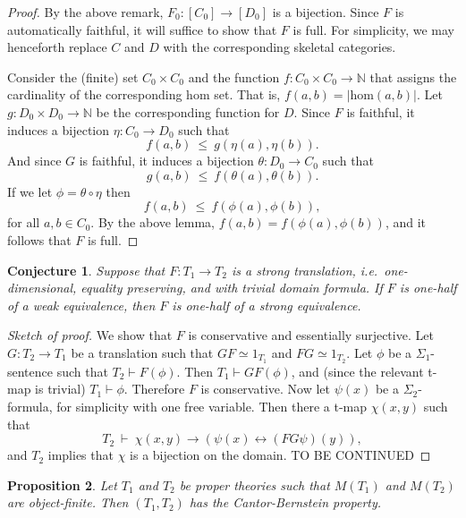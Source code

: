 \documentclass[12pt]{article}
\newtheorem{prop}{Proposition}
\newtheorem{conj}[prop]{Conjecture}
\theoremstyle{definition}
\theoremstyle{remark}
\newcommand{\3}{\mathcal}
\begin{document}
\begin{proof} By the above remark, $F_0:[C_0]\to [D_0]$ is a
  bijection. Since $F$ is automatically faithful, it will suffice to
  show that $F$ is full. For simplicity, we may henceforth replace $C$
  and $D$ with the corresponding skeletal categories.

  Consider the (finite) set $C_0\times C_0$ and the function
  $f:C_0\times C_0\to \mathbb{N}$ that assigns the cardinality of the
  corresponding hom set. That is, $f(a,b)=|\mathrm{hom}(a,b)|$. Let
  $g:D_0\times D_0\to\mathbb{N}$ be the corresponding function for
  $D$. Since $F$ is faithful, it induces a bijection
  $\eta :C_0\to D_0$ such that
  \[ f(a,b) \: \leq \: g(\eta (a),\eta (b)) .\] And since $G$ is
  faithful, it induces a bijection $\theta :D_0\to C_0$ such that
  \[ g(a,b) \: \leq \: f(\theta (a),\theta (b)) .\] If we let
  $\phi = \theta \circ\eta$ then
  \[ f(a,b) \: \leq \: f(\phi (a),\phi (b)) ,\] for all $a,b\in
  C_0$. By the above lemma, $f(a,b)=f(\phi (a),\phi (b))$, and it
  follows that $F$ is full. \end{proof}

\begin{conj} Suppose that $F:T_1\to T_2$ is a strong translation,
  i.e.\ one-dimensional, equality preserving, and with trivial domain
  formula. If $F$ is one-half of a weak equivalence, then $F$ is
  one-half of a strong equivalence. \end{conj}

\begin{proof}[Sketch of proof] We show that $F$ is conservative and
  essentially surjective. Let $G:T_2\to T_1$ be a translation such
  that $GF\simeq 1_{T_1}$ and $FG\simeq 1_{T_2}$. Let $\phi$ be a
  $\Sigma _1$-sentence such that $T_2\vdash F(\phi )$. Then
  $T_1\vdash GF(\phi )$, and (since the relevant t-map is trivial)
  $T_1\vdash \phi$. Therefore $F$ is conservative. Now let $\psi (x)$
  be a $\Sigma _2$-formula, for simplicity with one free
  variable. Then there a t-map $\chi (x,y)$ such that
  \[ T_2\: \vdash \: \chi (x,y)\to (\psi (x)\leftrightarrow (FG\psi
    )(y)) ,
  \] and $T_2$ implies that $\chi$ is a bijection on the domain. TO BE CONTINUED
 
\end{proof}

\begin{prop} Let $T_1$ and $T_2$ be proper theories such that $M(T_1)$
  and $M(T_2)$ are object-finite. Then $(T_1,T_2)$ has the
  Cantor-Bernstein property. \end{prop}
\end{document}
